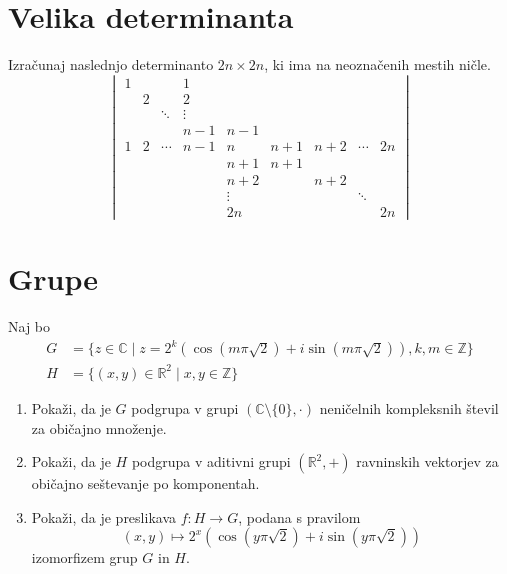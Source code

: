 \documentclass[a4paper,12pt]{article}
\begin{document}
\section*{Velika determinanta}

Izračunaj naslednjo determinanto \(2n \times 2n\), ki ima na neoznačenih mestih ničle.
\[
\begin{vmatrix}
      1 & & & 1 & & & & \\
      & 2 & & 2 & & & & \\
      & & \ddots & \vdots & & & & \\
      & & & n-1 & n-1 & & & \\
      1 & 2 & \cdots & n-1 & n & n+1 & n+2 & \cdots & 2n \\
      & & & & n+1 & n+1 & & & \\
      & & & & n+2 & & n+2 & & \\
      & & & & \vdots & & & \ddots & \\
      & & & & 2n & & & & 2n
\end{vmatrix}
\]

\section*{Grupe}

Naj bo
\begin{align*}
    G &= \{z \in \mathbb{C} \mid z = 2^k (\cos(m\pi\sqrt{2}) + i\sin(m\pi\sqrt{2})), k,m \in \mathbb{Z}\} \\
    H &= \{(x,y) \in \mathbb{R}^2 \mid x,y \in \mathbb{Z}\}
\end{align*}
\begin{enumerate}
\item
Pokaži, da je \(G\) podgrupa v grupi \((\mathbb{C} \setminus \{0\}, \cdot)\)
neničelnih kompleksnih števil za običajno množenje.

\item
Pokaži, da je \(H\) podgrupa v aditivni grupi \((\mathbb{R}^2, +)\)
ravninskih vektorjev za običajno seštevanje po komponentah.

\item
Pokaži, da je preslikava \(f: H \to G\), podana s pravilom
\[(x,y) \mapsto 2^x(\cos(y\pi\sqrt{2}) + i\sin(y\pi\sqrt{2}))\]
izomorfizem grup \(G\) in \(H\).
\end{enumerate}
\end{document}
